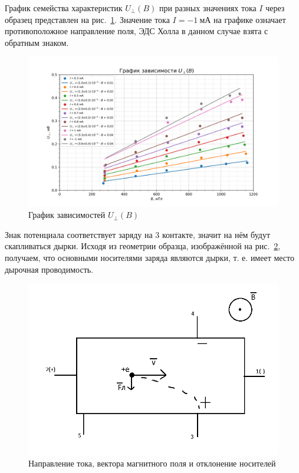 \documentclass[a4paper, 12pt]{article}
\begin{document}
\newpage

График семейства характеристик $U_{\perp}(B)$ при разных значениях тока $I$ через образец представлен на рис.~\ref{plot2}. Значение тока $I = -1~мА$ на графике означает противоположное направление поля, ЭДС Холла в данном случае взята с обратным знаком.

\begin{figure}[h!]
\begin{center}
    \includegraphics[scale=0.7]{3.3.4_2.png}
\end{center}
\caption{График зависимостей $U_{\perp}(B)$}
\label{plot2}
\end{figure}

\newpage

Знак потенциала соответствует заряду на 3 контакте, значит на нём будут скапливаться дырки. Исходя из геометрии образца, изображённой на рис.~\ref{ris3}, получаем, что основными носителями заряда являются дырки, т. е. имеет место дырочная проводимость.

\begin{figure}[h!]
\begin{center}
    \includegraphics[scale=0.5]{pic.png}
\end{center}
\caption{Направление тока, вектора магнитного поля и отклонение носителей}
\label{ris3}
\end{figure}
\end{document}
